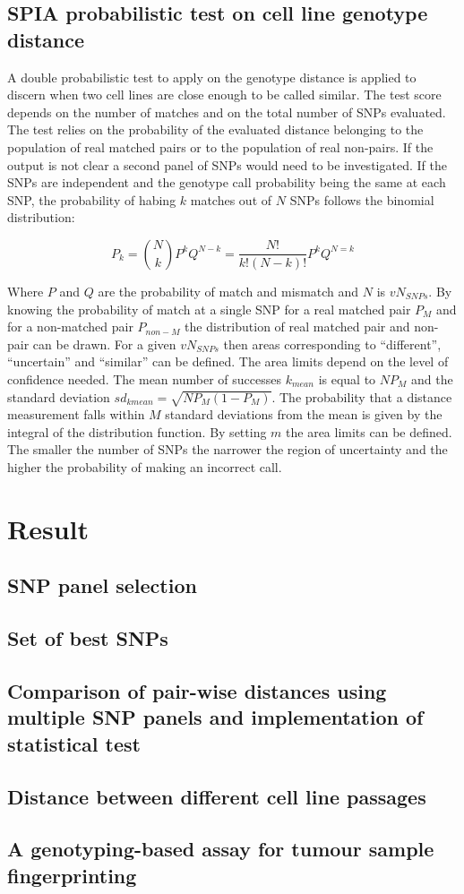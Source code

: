 	\subsection{SPIA probabilistic test on cell line genotype distance}
	A double probabilistic test to apply on the genotype distance is applied to discern when two cell lines are close enough to be called similar.
	The test score depends on the number of matches and on the total number of SNPs evaluated.
	The test relies on the probability of the evaluated distance belonging to the population of real matched pairs or to the population of real non-pairs.
	If the output is not clear a second panel of SNPs would need to be investigated.
	If the SNPs are independent and the genotype call probability being the same at each SNP, the probability of habing $k$ matches out of $N$ SNPs follows the binomial distribution:

	$$P_k = \binom{N}{k} P^kQ^{N-k} = \frac{N!}{k!(N-k)!}P^kQ^{N=k}$$

	Where $P$ and $Q$ are the probability of match and mismatch and $N$ is $vN_{SNPs}$.
	By knowing the probability of match at a single SNP for a real matched pair $P_M$ and for a non-matched pair $P_{non-M}$ the distribution of real matched pair and non-pair can be drawn.
	For a given $vN_{SNPs}$ then areas corresponding to ``different'', ``uncertain'' and ``similar'' can be defined.
	The area limits depend on the level of confidence needed.
	The mean number of successes $k_{mean}$ is equal to $NP_M$ and the standard deviation $sd_{kmean} = \sqrt{NP_M(1-P_M)}$.
	The probability that a distance measurement falls within $M$ standard deviations from the mean is given by the integral of the distribution function.
	By setting $m$ the area limits can be defined.
	The smaller the number of SNPs the narrower the region of uncertainty and the higher the probability of making an incorrect call.

\section{Result}

	\subsection{SNP panel selection}

	\subsection{Set of best SNPs}

	\subsection{Comparison of pair-wise distances using multiple SNP panels and implementation of statistical test}

	\subsection{Distance between different cell line passages}

	\subsection{A genotyping-based assay for tumour sample fingerprinting}
